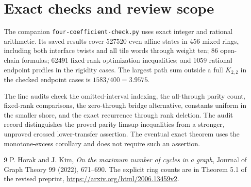 \documentclass[11pt]{article}
\begin{document}






\section{Exact checks and review scope}
The companion \nolinkurl{four-coefficient-check.py} uses exact integer and rational arithmetic.
Its saved results cover 527520 even affine states in 456 mixed rings, including both interface twists and all tile words through weight ten; 86 open-chain formulas; 62491 fixed-rank optimization inequalities; and 1059 rational endpoint profiles in the rigidity cases.
The largest path sum outside a full $K_{2,2}$ in the checked endpoint cases is $1583/400=3.9575$.

The line audits check the omitted-interval indexing, the all-through parity count, fixed-rank comparisons, the zero-through bridge alternative, constants uniform in the smaller shore, and the exact recurrence through rank deletion.
The audit record distinguishes the proved parity limsup inequalities from a stronger, unproved crossed lower-transfer assertion.
The eventual exact theorem uses the monotone-excess corollary and does not require such an assertion.

\begin{thebibliography}{9}
 P. Horak and J. Kim, \emph{On the maximum number of cycles in a graph}, Journal of Graph Theory 99 (2022), 671--690.
The explicit ring counts are in Theorem 5.1 of the revised preprint, \url{https://arxiv.org/html/2006.13459v2}.
\end{thebibliography}
\end{document}

